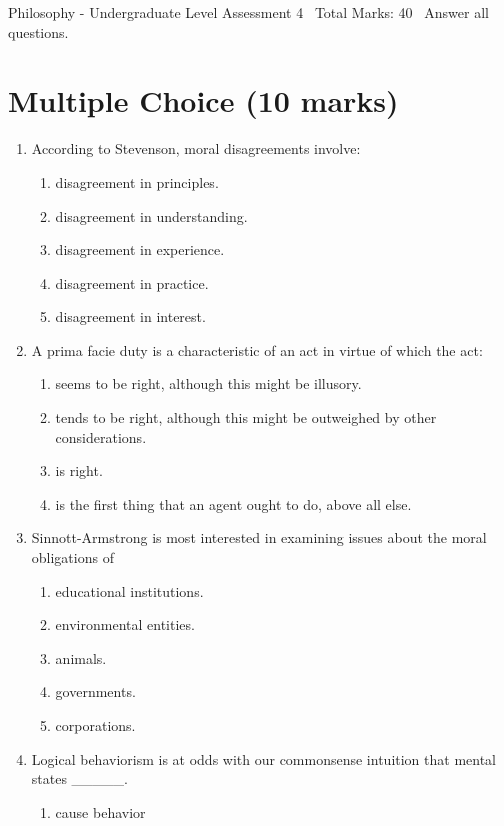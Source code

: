 \documentclass[12pt]{article}
\begin{document}
\begin{center}
Philosophy - Undergraduate Level Assessment 4 \
Total Marks: 40 \
Answer all questions.
\end{center}

\section*{Multiple Choice (10 marks)}
\begin{enumerate}[label=\arabic*.]
\item According to Stevenson, moral disagreements involve:
\begin{enumerate}[label=(\alph*)]
    \item disagreement in principles.
    \item disagreement in understanding.
    \item disagreement in experience.
    \item disagreement in practice.
    \item disagreement in interest.
\end{enumerate}
\item A prima facie duty is a characteristic of an act in virtue of which the act:
\begin{enumerate}[label=(\alph*)]
    \item seems to be right, although this might be illusory.
    \item tends to be right, although this might be outweighed by other considerations.
    \item is right.
    \item is the first thing that an agent ought to do, above all else.
\end{enumerate}
\item Sinnott-Armstrong is most interested in examining issues about the moral obligations of
\begin{enumerate}[label=(\alph*)]
    \item educational institutions.
    \item environmental entities.
    \item animals.
    \item governments.
    \item corporations.
\end{enumerate}
\item Logical behaviorism is at odds with our commonsense intuition that mental states \_\_\_\_\_.
\begin{enumerate}[label=(\alph*)]
    \item cause behavior

\end{enumerate}
\end{enumerate}
\end{document}
